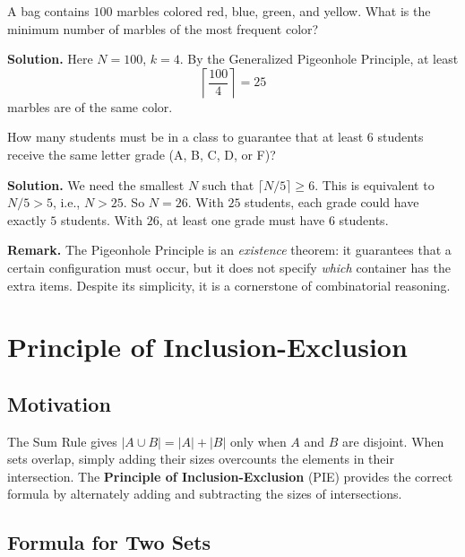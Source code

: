 \documentclass[11pt,a4paper]{article}
\begin{document}
\begin{example}
A bag contains $100$ marbles colored red, blue, green, and yellow. What is the minimum number of marbles of the most frequent color?

\textbf{Solution.} Here $N = 100$, $k = 4$. By the Generalized Pigeonhole Principle, at least
\begin{equation*}
    \left\lceil \frac{100}{4} \right\rceil = 25
\end{equation*}
marbles are of the same color.
\end{example}

\begin{example}
How many students must be in a class to guarantee that at least $6$ students receive the same letter grade (A, B, C, D, or F)?

\textbf{Solution.} We need the smallest $N$ such that $\lceil N/5 \rceil \geq 6$. This is equivalent to $N/5 > 5$, i.e., $N > 25$. So $N = 26$. With $25$ students, each grade could have exactly $5$ students. With $26$, at least one grade must have $6$ students.
\end{example}

\textbf{Remark.} The Pigeonhole Principle is an \textit{existence} theorem: it guarantees that a certain configuration must occur, but it does not specify \textit{which} container has the extra items. Despite its simplicity, it is a cornerstone of combinatorial reasoning.

\section{Principle of Inclusion-Exclusion}

\subsection{Motivation}

The Sum Rule gives $|A \cup B| = |A| + |B|$ only when $A$ and $B$ are disjoint. When sets overlap, simply adding their sizes overcounts the elements in their intersection. The \textbf{Principle of Inclusion-Exclusion} (PIE) provides the correct formula by alternately adding and subtracting the sizes of intersections.

\subsection{Formula for Two Sets}
\end{document}
